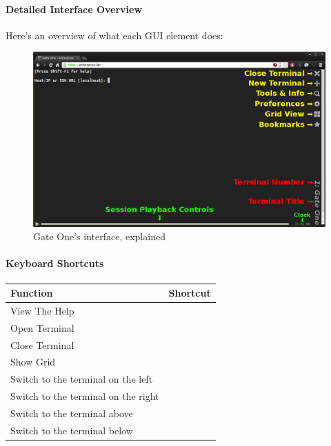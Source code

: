 \documentclass[letterpaper,10pt,openany]{sphinxmanual}
\begin{document}
\paragraph{Detailed Interface Overview}
\label{Applications/terminal/userguide:detailed-interface-overview}
Here's an overview of what each GUI element does:
\begin{figure}[htbp]
\centering
\capstart

\includegraphics{gateone_login_explained.png}
\caption{Gate One's interface, explained}\end{figure}


\paragraph{Keyboard Shortcuts}
\label{Applications/terminal/userguide:keyboard-shortcuts}
\begin{tabulary}{\linewidth}{|L|L|}
\hline
\textsf{\relax 
Function
} & \textsf{\relax 
Shortcut
}\\
\hline
View The Help
 & 
\\
\hline
Open Terminal
 & 
\\
\hline
Close Terminal
 & 
\\
\hline
Show Grid
 & 
\\
\hline
Switch to the terminal on the left
 & 
\\
\hline
Switch to the terminal on the right
 & 
\\
\hline
Switch to the terminal above
 & 
\\
\hline
Switch to the terminal below
 & 
\\
\hline\end{tabulary}
\end{document}
